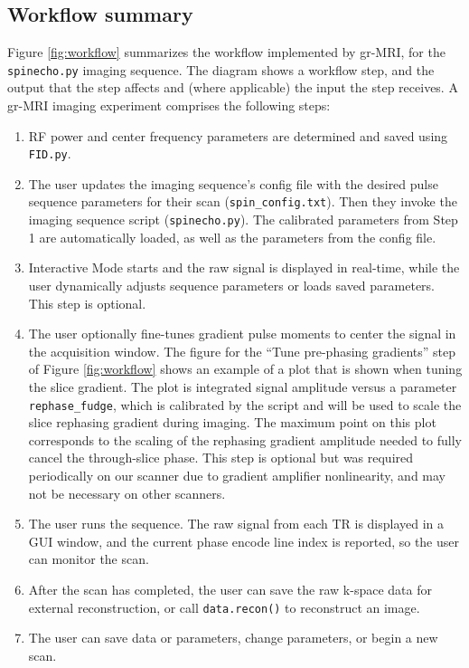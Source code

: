 \documentclass[review]{elsarticle}
\begin{document}
\subsection{Workflow summary}
Figure \ref{fig:workflow} summarizes the workflow implemented by gr-MRI, 
for the \texttt{spinecho.py} imaging sequence.  
The diagram shows a workflow step, 
and the output that the step affects and (where applicable) the input the step receives.  
A gr-MRI imaging experiment comprises the following steps: 
\begin{enumerate}
\item RF power and center frequency parameters are determined and saved using \texttt{FID.py}.  
\item The user updates the imaging sequence's config file with the desired pulse sequence parameters for their scan (\texttt{spin\_config.txt}).  
Then they invoke the imaging sequence script (\texttt{spinecho.py}).  
The calibrated parameters from Step 1 are automatically loaded, as well as the parameters 
from the config file. 
\item Interactive Mode starts and the raw signal is displayed in real-time, 
while the user dynamically adjusts sequence parameters or loads saved parameters. 
This step is optional.
\item The user optionally fine-tunes gradient pulse moments 
to center the signal in the acquisition window.
The figure for the ``Tune pre-phasing gradients'' step of Figure \ref{fig:workflow} shows an example of a plot that is shown when tuning the slice gradient.
The plot is integrated signal amplitude versus 
a parameter \texttt{rephase\_fudge}, 
which is calibrated by the script and will 
be used to scale the slice rephasing gradient during imaging.
The maximum point on this plot corresponds to the scaling of the rephasing gradient amplitude needed to fully cancel the through-slice phase.
This step is optional but was required periodically on our scanner due to gradient amplifier nonlinearity, 
and may not be necessary on other scanners.
\item The user runs the sequence.
The raw signal from each TR is displayed in a GUI window, and the current phase encode line index is reported, so the user can monitor the scan.  
\item After the scan has completed, the user can save the raw k-space data for external reconstruction, 
or call \texttt{data.recon()} to reconstruct an image.  
\item The user can save data or parameters, 
change parameters, or begin a new scan.
\end{enumerate}
\end{document}
